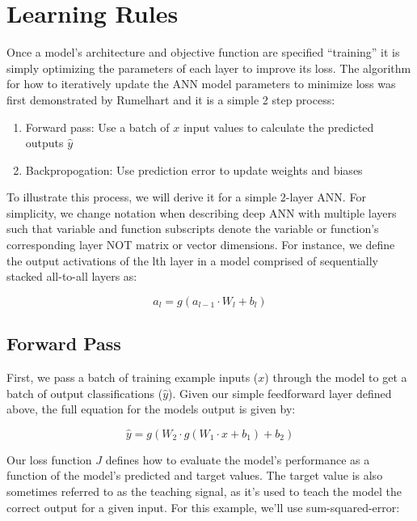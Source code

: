 \documentclass{templates/ucdenverthesis}
\begin{document}
\hypertarget{sec:learningrules}{%
\section{Learning Rules}\label{sec:learningrules}}

Once a model's architecture and objective function are specified ``training'' it is simply optimizing the parameters of each layer to improve its loss. The algorithm for how to iteratively update the ANN model parameters to minimize loss was first demonstrated by Rumelhart \autocite{Rumelhart:1986er} and it is a simple 2 step process:

\begin{enumerate}
\def\labelenumi{\arabic{enumi})}
\tightlist
\item
  Forward pass: Use a batch of \(x\) input values to calculate the predicted outputs \(\hat{y}\)
\item
  Backpropogation: Use prediction error to update weights and biases
\end{enumerate}

To illustrate this process, we will derive it for a simple 2-layer ANN. For simplicity, we change notation when describing deep ANN with multiple layers such that variable and function subscripts denote the variable or function's corresponding layer NOT matrix or vector dimensions. For instance, we define the output activations of the lth layer in a model comprised of sequentially stacked all-to-all layers as:

\[
a_l = g(a_{l-1} \cdot W_l + b_l)
\]

\hypertarget{sec:fwdpass}{%
\subsection{Forward Pass}\label{sec:fwdpass}}

First, we pass a batch of training example inputs (\(x\)) through the model to get a batch of output classifications (\(\hat{y}\)). Given our simple feedforward layer defined above, the full equation for the models output is given by:

\[
\hat{y} = g(W_2 \cdot g(W_1 \cdot x +b_1) + b_2)
\]

Our loss function \(J\) defines how to evaluate the model's performance as a function of the model's predicted and target values. The target value is also sometimes referred to as the teaching signal, as it's used to teach the model the correct output for a given input. For this example, we'll use sum-squared-error:
\end{document}
